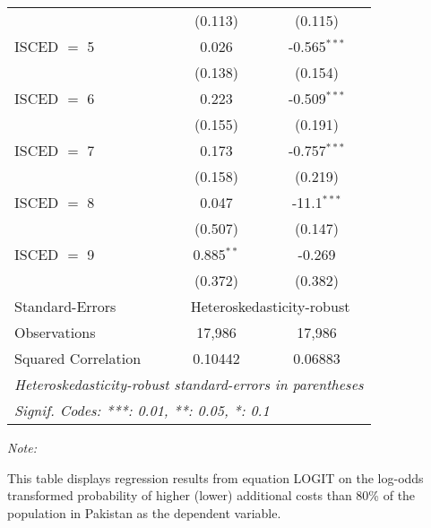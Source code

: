 \begin{table}[htbp!]
\begin{adjustbox}{width = 1\textwidth, max height = 0.95\textheight, center}
\begin{threeparttable}[b]
\begin{tabular}{lcc}
                                 & (0.113)        & (0.115)\\   
            ISCED $=$ 5          & 0.026          & -0.565$^{***}$\\   
                                 & (0.138)        & (0.154)\\   
            ISCED $=$ 6          & 0.223          & -0.509$^{***}$\\   
                                 & (0.155)        & (0.191)\\   
            ISCED $=$ 7          & 0.173          & -0.757$^{***}$\\   
                                 & (0.158)        & (0.219)\\   
            ISCED $=$ 8          & 0.047          & -11.1$^{***}$\\   
                                 & (0.507)        & (0.147)\\   
            ISCED $=$ 9          & 0.885$^{**}$   & -0.269\\   
                                 & (0.372)        & (0.382)\\   
            \midrule 
            Standard-Errors & \multicolumn{2}{c}{Heteroskedasticity-robust} \\ 
            Observations         & 17,986         & 17,986\\  
            Squared Correlation  & 0.10442        & 0.06883\\  
            \midrule \midrule
            \multicolumn{3}{l}{\emph{Heteroskedasticity-robust standard-errors in parentheses}}\\
            \multicolumn{3}{l}{\emph{Signif. Codes: ***: 0.01, **: 0.05, *: 0.1}}\\
         \end{tabular}
         
         \begin{tablenotes}\item \medskip \textit{Note:}
            \item This table displays regression results from equation LOGIT on the log-odds transformed probability of higher (lower) additional costs than 80\% of the population in Pakistan as the dependent variable. 
         \end{tablenotes}
      \end{threeparttable}
   \end{adjustbox}
\end{table}


